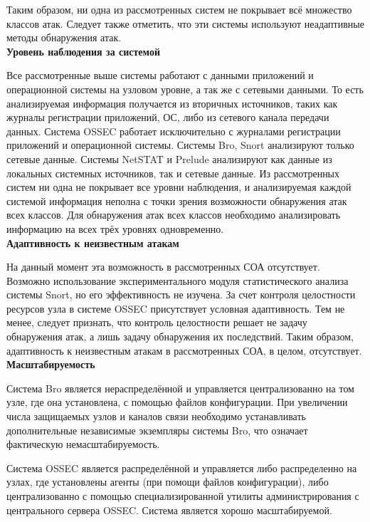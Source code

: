 Таким образом, ни одна из рассмотренных систем не покрывает всё множество
классов атак. Следует также отметить, что эти системы используют неадаптивные
методы обнаружения атак.\\

\textbf{Уровень наблюдения за системой}

Все рассмотренные выше системы работают с данными приложений и
операционной системы на узловом уровне, а так же с сетевыми данными. То есть
анализируемая информация получается из вторичных источников, таких как журналы
регистрации приложений, ОС, либо из сетевого канала передачи данных.
Система OSSEC работает исключительно с журналами регистрации приложений и
операционной системы. Системы Bro, Snort анализируют только сетевые данные.
Системы NetSTAT и Prelude анализируют как данные из локальных системных
источников, так и сетевые данные.
Из рассмотренных систем ни одна не покрывает все уровни наблюдения, и
анализируемая каждой системой информация неполна с точки зрения возможности
обнаружения атак всех классов. Для обнаружения атак всех классов необходимо
анализировать информацию на всех трёх уровнях одновременно.\\

\textbf{Адаптивность к неизвестным атакам}

На данный момент эта возможность в рассмотренных СОА отсутствует. Возможно
использование экспериментального модуля статистического анализа системы Snort, но
его эффективность не изучена. За счет контроля целостности ресурсов узла в системе
OSSEC присутствует условная адаптивность. Тем не менее, следует признать, что
контроль целостности решает не задачу обнаружения атак, а лишь задачу обнаружения
их последствий. Таким образом, адаптивность к неизвестным атакам в рассмотренных
СОА, в целом, отсутствует.\\

\textbf{Масштабируемость}

Система Bro является нераспределённой и управляется централизованно на том
узле, где она установлена, с помощью файлов конфигурации. При увеличении числа
защищаемых узлов и каналов связи необходимо устанавливать дополнительные
независимые экземпляры системы Bro, что означает фактическую немасштабируемость.

Система OSSEC является распределённой и управляется либо распределенно на
узлах, где установлены агенты (при помощи файлов конфигурации), либо
централизованно с помощью специализированной утилиты администрирования
с центрального сервера OSSEC. Система является хорошо
масштабируемой.

